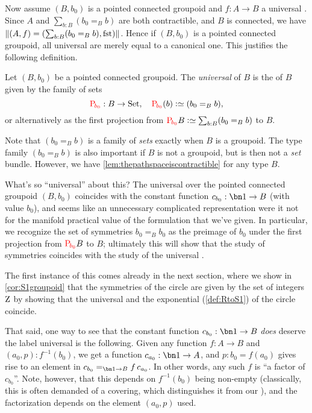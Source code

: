 Now assume $(B,b_0)$ is a pointed connected groupoid and $f:A\to B$
a universal \covering. Since $A$ and $\sum_{b:B}(b_0=_Bb)$ are both
contractible, and $B$ is connected, we have
$\Trunc{(A,f)=(\sum_{b:B}(b_0=_Bb),\fst)}$. 
Hence if $(B,b_0)$ is a pointed connected groupoid, all
universal \coverings are merely equal to a canonical one. 
This justifies the following definition.
\begin{definition}
  \label{def:universalcover}
  Let $(B,b_0)$ be a pointed connected groupoid.  
The \emph{universal \covering} of $B$ is the \covering of $B$ given by the family of sets 
  $$\uc{b_0}:B\to\Set,\quad \uc{b_0}(b)\defequi (b_0=_Bb),$$
or alternatively as the first projection from $\uc{b_0}B\defequi\sum_{b:B}(b_0=_Bb)$ to $B$. 
\end{definition}
Note that $(b_0=_B b)$ is a family of \emph{sets} exactly when $B$ is a groupoid.
The type family $(b_0=_B b)$ is also important if $B$ is not a groupoid,
but is then not a \emph{set} bundle.
However, we have \cref{lem:thepathspaceiscontractible} for any type $B$.

\begin{remark}
  What's so ``universal'' about this?
The universal \covering over the pointed connected groupoid $(B,b_0)$ coincides with the constant function $c_{b_0}:\bn 1\to B$ (with value $b_0$), and seems like an unnecessary complicated representation were it not for the manifold practical value of the formulation that we've given.  
In particular, we recognize the set of symmetries $b_0=_Bb_0$ as the preimage of $b_0$ under the first projection from ${\color{red}\mathrm{P}_{\!b_0}}B$ to $B$; ultimately this will show that the study of symmetries coincides with the study of the universal \covering.

The first instance of this comes already in the next section, where we show in \cref{cor:S1groupoid} that the symmetries of the circle are given by the set of integers $\mathrm{Z}$ by showing that the universal \covering and the exponential \covering (\cref{def:RtoS1}) of the circle coincide.

That said, one way to see that the constant function $c_{b_0}:\bn 1\to B$
\emph{does} deserve the label universal is the following. 
Given any function $f:A\to B$ and $(a_0,p): f^{-1}(b_0)$, 
we get a function $c_{a_0}:\bn 1\to A$, and $p:b_0=f(a_0)$ gives rise to
an element in $c_{b_0}=_{\bn 1\to B}f\, c_{a_0}$.  
In other words, any such $f$ is ``a factor of $c_{b_0}$''.  
Note, however, that this depends on $f^{-1}(b_0)$ being non-empty
(classically, this is often demanded of a covering, which distinguishes it from our \coverings), 
and the factorization depends on the element $(a_0,p)$ used. 
\end{remark}



